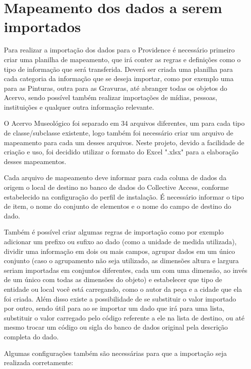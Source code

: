 \documentclass[a4paper,12pt,oneside,onecolumn,final,fleqn]{repUERJ}
\begin{document}
\section{Mapeamento dos dados a serem importados}

Para realizar a importação dos dados para o Providence é necessário primeiro criar uma planilha de mapeamento, que irá conter as regras e definições como o tipo de informação que será transferida. Deverá ser criada uma planilha para cada categoria da informação que se deseja importar, como por exemplo uma para as Pinturas, outra para as Gravuras, até abranger todas os objetos do Acervo, sendo possível também realizar importações de mídias, pessoas, instituições e qualquer outra informação relevante.

O Acervo Museológico foi separado em 34 arquivos diferentes, um para cada tipo de classe/subclasse existente, logo também foi necessário criar um arquivo de mapeamento para cada um desses arquivos. Neste projeto, devido a facilidade de criação e uso, foi decidido utilizar o formato do Excel ".xlsx" para a elaboração desses mapeamentos.

Cada arquivo de mapeamento deve informar para cada coluna de dados da origem o local de destino no banco de dados do Collective Access, conforme estabelecido na configuração do perfil de instalação. É necessário informar o tipo de item, o nome do conjunto de elementos e o nome do campo de destino do dado.

Também é possível criar algumas regras de importação como por exemplo adicionar um prefixo ou sufixo ao dado (como a unidade de medida utilizada), dividir uma informação em dois ou mais campos, agrupar dados em um único conjunto (caso o agrupamento não seja utilizado, as dimensões altura e largura seriam importadas em conjuntos diferentes, cada um com uma dimensão, ao invés de um único com todas as dimensões do objeto) e estabelecer que tipo de entidade ou local você está carregando, como o autor da peça e a cidade que ela foi criada. Além disso existe a possibilidade de se substituir o valor importado por outro, sendo útil para ao se importar um dado que irá para uma lista, substituir o valor carregado pelo código referente a ele na lista de destino, ou até mesmo trocar um código ou sigla do banco de dados original pela descrição completa do dado.

Algumas configurações também são necessárias para que a importação seja realizada corretamente: 
\end{document}
